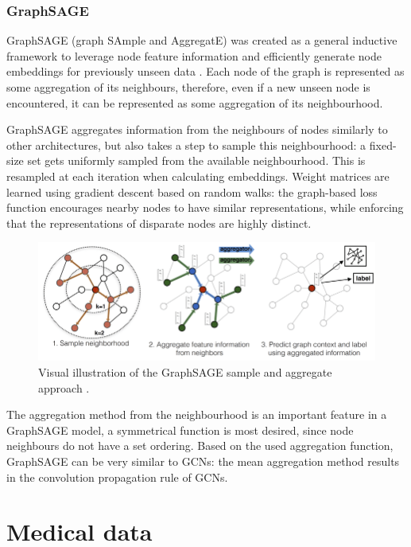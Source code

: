 	
	\subsubsection{GraphSAGE}
	
	GraphSAGE (graph SAmple and AggregatE) was created as a general inductive framework to leverage node feature information and efficiently generate node embeddings for previously unseen data \cite{graphasge_paper}. Each node of the graph is represented as some aggregation of its neighbours, therefore, even if a new unseen node is encountered, it can be represented as some aggregation of its neighbourhood. 
	
	GraphSAGE aggregates information from the neighbours of nodes similarly to other architectures, but also takes a step to sample this neighbourhood: a fixed-size set gets uniformly sampled from the available neighbourhood. This is resampled at each iteration when calculating embeddings. Weight matrices are learned using gradient descent based on random walks: the	graph-based loss function encourages nearby nodes to have similar representations, while enforcing that the representations of disparate nodes are highly distinct.
	
	\begin{figure}[!h]
		\centering
		\includegraphics[width=\textwidth]{figures/graphsage.png}
		\caption{Visual illustration of the GraphSAGE sample and aggregate approach \cite{graphasge_paper}.}
	\end{figure}
	
	The aggregation method from the neighbourhood is an important feature in a GraphSAGE model, a symmetrical function is most desired, since node neighbours do not have a set ordering. Based on the used aggregation function, GraphSAGE can be very similar to GCNs: the mean aggregation method results in the convolution propagation rule of GCNs. 
	
\section{Medical data}

